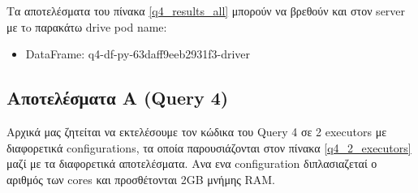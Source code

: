 \documentclass[12pt, a4paper]{article}
\begin{document}
\noindent Τα αποτελέσματα του πίνακα \ref{q4_results_all} μπορούν να βρεθούν και στον server
με τo παρακάτω drive pod name: 

\begin{itemize}
\item DataFrame: q4-df-py-63daff9eeb2931f3-driver 
\end{itemize}




\subsection*{Αποτελέσματα A (Query 4)}

Αρχικά μας ζητείται να εκτελέσουμε τον κώδικα του Query 4 σε 2 executors με διαφορετικά configurations, τα 
οποία παρουσιάζονται στον πίνακα \ref{q4_2_executors} μαζί με τα διαφορετικά αποτελέσματα. 
Ανα ενα configuration διπλασιαζεταί ο αριθμός των cores και προσθέτονται 2GB μνήμης RAM. 

\begin{table}[h]
\centering
{}
\caption{Χρόνοι εκτέλεσης για τα διαφορετικά configurations με 2 executors.}
\label{q4_2_executors}
\end{table}
\end{document}
